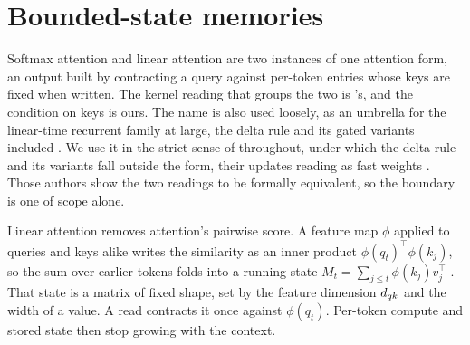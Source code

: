 %
%
%
\section{Bounded-state memories}
\label{sec:background}

Softmax attention \citep{vaswani2017} and linear attention are two instances of one attention form, an output built by contracting a query against per-token entries whose keys are fixed when written. The kernel reading that groups the two is \citet{tsai2019}'s, and the condition on keys is ours. The name is also used loosely, as an umbrella for the linear-time recurrent family at large, the delta rule and its gated variants included \citep{yang2024fla}. We use it in the strict sense of \citet{katharopoulos2020} throughout, under which the delta rule and its variants fall outside the form, their updates reading as fast weights \citep{schlag2021fwp}. Those authors show the two readings to be formally equivalent, so the boundary is one of scope alone.

Linear attention removes attention's pairwise score. A feature map $\phi$ applied to queries and keys alike writes the similarity as an inner product $\phi(q_t)^\top \phi(k_j)$, so the sum over earlier tokens folds into a running state $M_t = \sum_{j \le t} \phi(k_j) v_j^\top$ \citep{katharopoulos2020}. That state is a matrix of fixed shape, set by the feature dimension $d_{qk}$ and the width of a value. A read contracts it once against $\phi(q_t)$. Per-token compute and stored state then stop growing with the context.

